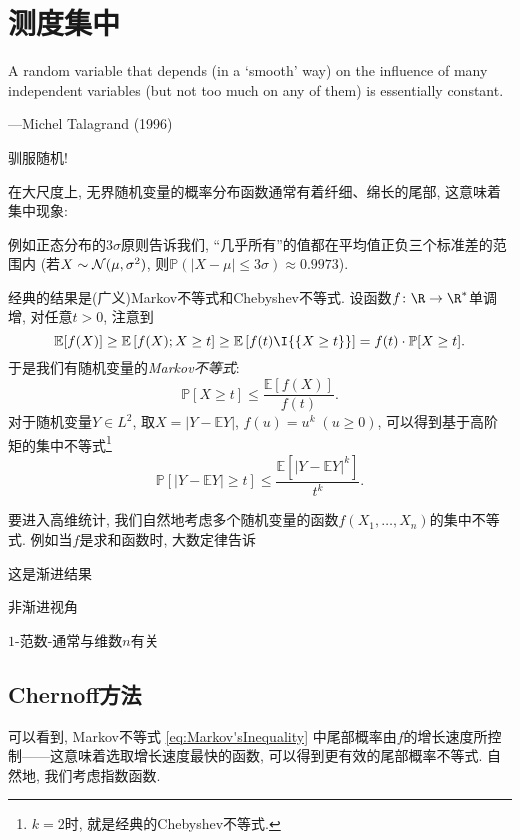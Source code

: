 \section{测度集中}

\epigraph{A random variable that depends (in a ‘smooth’ way) on the influence of many independent variables (but not too much on any of them) is essentially constant.}{---Michel Talagrand (1996)}

驯服随机! 

在大尺度上, 无界随机变量的概率分布函数通常有着纤细、绵长的尾部, 这意味着集中现象: 

例如正态分布的$3 \sigma$原则告诉我们, “几乎所有”的值都在平均值正负三个标准差的范围内 (若$X \sim \mathcal{N}(\mu, \sigma^2)$, 则$\mathbb{P}(|X - \mu| \leq 3 \sigma) \approx 0.9973$). 

经典的结果是(广义)Markov不等式和Chebyshev不等式.
设函数$f \colon \R \to \R^*$单调增, 对任意$t > 0$, 注意到
\begin{equation*}
	\mathbb{E}[f(X)] 
		\geq \mathbb{E}\left[f(X); X \geq t \right]
		\geq \mathbb{E}\left[f(t) \I{\{X \geq t\}} \right] 
		= f(t) \cdot \mathbb{P}[X \geq t].
\end{equation*}
于是我们有随机变量的\emph{Markov不等式}: 
\begin{equation}\label{eq:Markov'sInequality}
	\mathbb{P}[X \geq t] \leq \frac{\mathbb{E}[f(X)]}{f(t)}.
\end{equation}
对于随机变量$Y \in L^2$, 取$X = |Y - \mathbb{E}Y|$, $f(u) = u^k\; (u \geq 0)$, 可以得到基于高阶矩的集中不等式\footnote{$k=2$时, 就是经典的Chebyshev不等式. }
\begin{equation*}
	\mathbb{P}[|Y - \mathbb{E}Y| \geq t] \leq \frac{ \mathbb{E}[ |Y - \mathbb{E}Y|^k]}{t^k}. 
\end{equation*} 


要进入高维统计, 我们自然地考虑多个随机变量的函数$f(X_1, \dots, X_n)$的集中不等式. 
例如当$f$是求和函数时, 大数定律告诉

这是渐进结果

非渐进视角

$1$-范数-通常与维数$n$有关




\subsection{Chernoff方法}

可以看到, Markov不等式 \eqref{eq:Markov'sInequality} 中尾部概率由$f$的增长速度所控制——这意味着选取增长速度最快的函数, 可以得到更有效的尾部概率不等式. 
自然地, 我们考虑指数函数. 


